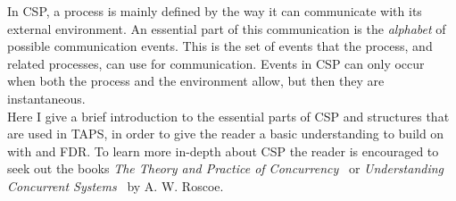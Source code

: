 In CSP, a process is mainly defined by the way it can communicate with its external environment. An essential part of this communication is the \textit{alphabet} of possible communication events. This is the set of events that the process, and related processes, can use for communication. Events in CSP can only occur when both the process and the environment allow, but then they are instantaneous.\\

Here I give a brief introduction to the essential parts of CSP and structures that are used in TAPS, in order to give the reader a basic understanding to build on with \cspm{} and FDR. To learn more in-depth about CSP the reader is encouraged to seek out the books \textit{The Theory and Practice of Concurrency}~\cite{Roscoe1997} or \textit{Understanding Concurrent Systems}~\cite{Roscoe2010} by A. W. Roscoe.

